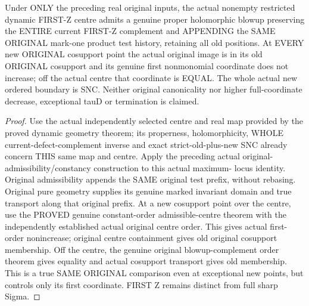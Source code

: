 \begin{theorem}
\label{hir:sharp-actual-dynamic-first-defect-original-test-step-comparison}
\leanok
Under ONLY the preceding real original inputs, the actual nonempty
restricted dynamic FIRST-Z centre admits a genuine proper holomorphic
blowup preserving the ENTIRE current FIRST-Z complement and APPENDING the
SAME ORIGINAL mark-one product test history, retaining all old positions.
At EVERY new ORIGINAL cosupport point the actual original image is in
its old ORIGINAL cosupport and its genuine first nonmonomial coordinate
does not increase; off the actual centre that coordinate is EQUAL. The
whole actual new ordered boundary is SNC. Neither original canonicality
nor higher full-coordinate decrease, exceptional tauD or termination is
claimed.
\end{theorem}
\begin{proof}
Use the actual independently selected centre and real map provided by
the proved dynamic geometry theorem; its properness, holomorphicity,
WHOLE current-defect-complement inverse and exact strict-old-plus-new SNC
already concern THIS same map and centre. Apply the preceding actual
original-admissibility/constancy construction to this actual maximum-
locus identity. Original admissibility appends the SAME original test
prefix, without rebasing. Original pure geometry supplies its genuine
marked invariant domain and true transport along that original prefix.
At a new cosupport point over the centre, use the PROVED genuine
constant-order admissible-centre theorem with the independently established
actual original centre order. This gives actual first-order nonincrease;
original centre containment gives old original cosupport membership.
Off the centre, the genuine original blowup-complement order theorem gives
equality and actual cosupport transport gives old membership. This is a
true SAME ORIGINAL comparison even at exceptional new points, but controls
only its first coordinate. FIRST Z remains distinct from full sharp Sigma.
\end{proof}
